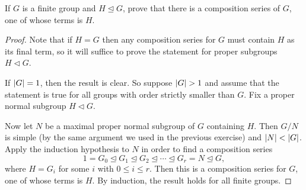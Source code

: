  \label{exercise:holder:comp-series-incl-H}
If $G$ is a finite group and $H\trianglelefteq G$, prove that there is
a composition series of $G$, one of whose terms is $H$.
\begin{proof}
  Note that if $H = G$ then any composition series for $G$ must
  contain $H$ as its final term, so it will suffice to prove the
  statement for proper subgroups $H\triangleleft G$.

  If $\lvert{G}\rvert = 1$, then the result is clear. So suppose $\lvert{G}\rvert > 1$
  and assume that the statement is true for all groups with order
  strictly smaller than $G$. Fix a proper normal subgroup
  $H\triangleleft G$.

  Now let $N$ be a maximal proper normal subgroup of $G$ containing
  $H$. Then $G/N$ is simple (by the same argument we used in the
  previous exercise) and $\lvert{N}\rvert < \lvert{G}\rvert$. Apply the induction
  hypothesis to $N$ in order to find a composition series
  \begin{equation*}
    1 = G_0 \trianglelefteq
    G_1 \trianglelefteq
    G_2 \trianglelefteq\cdots\trianglelefteq
    G_r = N \trianglelefteq G,
  \end{equation*}
  where $H = G_i$ for some $i$ with $0\leq i\leq r$. Then this is a
  composition series for $G$, one of whose terms is $H$. By induction,
  the result holds for all finite groups.
\end{proof}





